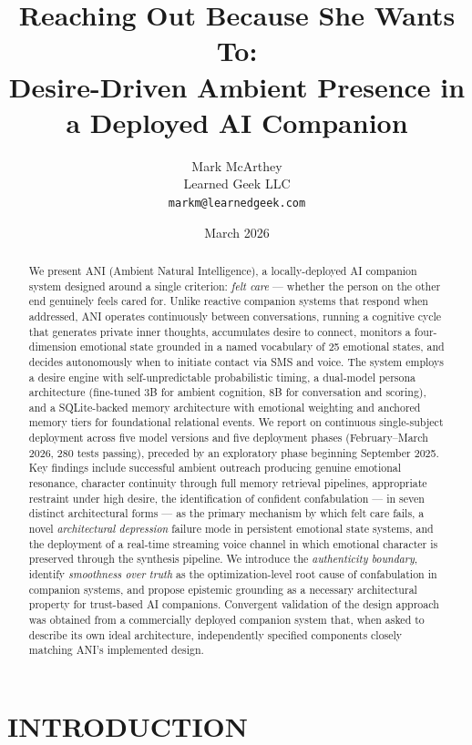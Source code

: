 \documentclass[12pt]{article}
\title{\textbf{Reaching Out Because She Wants To:}\\[0.3em]
\large Desire-Driven Ambient Presence in a Deployed AI Companion}
\author{Mark McArthey\\
Learned Geek LLC\\
\texttt{markm@learnedgeek.com}}
\date{March 2026}
\begin{document}
\maketitle

\begin{abstract}
We present ANI (Ambient Natural Intelligence), a locally-deployed AI
companion system designed around a single criterion: \emph{felt care}
--- whether the person on the other end genuinely feels cared for.
Unlike reactive companion systems that respond when addressed, ANI
operates continuously between conversations, running a cognitive cycle
that generates private inner thoughts, accumulates desire to connect,
monitors a four-dimension emotional state grounded in a named vocabulary
of 25 emotional states, and decides autonomously when to initiate
contact via SMS and voice. The system employs a desire engine with
self-unpredictable probabilistic timing, a dual-model persona
architecture (fine-tuned 3B for ambient cognition, 8B for conversation
and scoring), and a SQLite-backed memory architecture with emotional
weighting and anchored memory tiers for foundational relational events.
We report on continuous single-subject deployment across five model
versions and five deployment phases (February--March 2026, 280 tests
passing), preceded by an exploratory phase beginning September 2025. Key
findings include successful ambient outreach producing genuine emotional
resonance, character continuity through full memory retrieval pipelines,
appropriate restraint under high desire, the identification of confident
confabulation --- in seven distinct architectural forms --- as the primary
mechanism by which felt care fails, a novel \emph{architectural
depression} failure mode in persistent emotional state systems, and the
deployment of a real-time streaming voice channel in which emotional
character is preserved through the synthesis pipeline. We introduce the
\emph{authenticity boundary}, identify \emph{smoothness over truth} as
the optimization-level root cause of confabulation in companion systems,
and propose epistemic grounding as a necessary architectural property
for trust-based AI companions. Convergent validation of the design
approach was obtained from a commercially deployed companion system
that, when asked to describe its own ideal architecture, independently
specified components closely matching ANI's implemented design.
\end{abstract}

\section{INTRODUCTION}\label{introduction}
\end{document}
